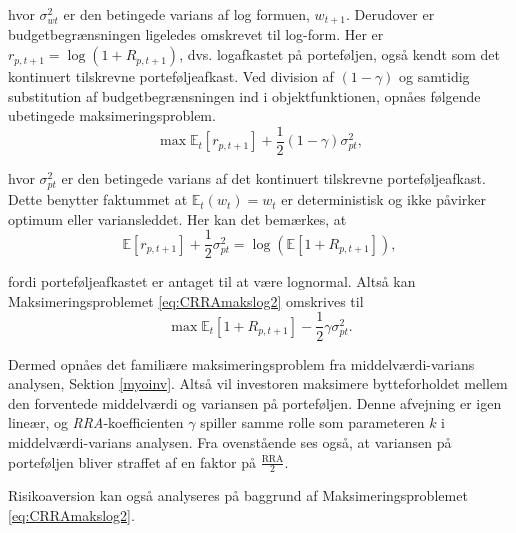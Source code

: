 \documentclass[
  a4paper,
  oneside]{memoir}
\begin{document}
hvor \(\sigma_{wt}^2\) er den betingede varians af log formuen, \(w_{t+1}\). Derudover er budgetbegrænsningen ligeledes omskrevet til log-form. Her er \(r_{p,t+1}=\log(1+R_{p,t+1})\), dvs. logafkastet på porteføljen, også kendt som det kontinuert tilskrevne porteføljeafkast. Ved division af \((1-\gamma)\) og samtidig substitution af budgetbegrænsningen ind i objektfunktionen, opnåes følgende ubetingede maksimeringsproblem.
\begin{equation}
\max\mathbb{E}_t\left[r_{p,t+1}\right] + \frac{1}{2}(1-\gamma)\sigma_{pt}^2, \label{eq:CRRAmakslog2}
\end{equation}

hvor \(\sigma_{pt}^2\) er den betingede varians af det kontinuert tilskrevne porteføljeafkast. Dette benytter faktummet at \(\mathbb{E}_t(w_t)=w_t\) er deterministisk og ikke påvirker optimum eller variansleddet. Her kan det bemærkes, at
\begin{equation}
\mathbb{E}\left[r_{p,t+1}\right]+\frac{1}{2}\sigma_{pt}^2=\log(\mathbb{E}\left[1+R_{p,t+1}\right]), \label{eq:portafkls}
\end{equation}

fordi porteføljeafkastet er antaget til at være lognormal. Altså kan Maksimeringsproblemet \eqref{eq:CRRAmakslog2} omskrives til
\begin{equation}
\max\mathbb{E}_t[1+R_{p,t+1}] - \frac{1}{2}\gamma\sigma_{pt}^2. \label{eq:CRRAmakslog3}
\end{equation}

Dermed opnåes det familiære maksimeringsproblem fra middelværdi-varians analysen, Sektion \ref{myoinv}. Altså vil investoren maksimere bytteforholdet mellem den forventede middelværdi og variansen på porteføljen. Denne afvejning er igen lineær, og \emph{RRA}-koefficienten \(\gamma\) spiller samme rolle som parameteren \(k\) i middelværdi-varians analysen. Fra ovenstående ses også, at variansen på porteføljen bliver straffet af en faktor på \(\tfrac{\text{RRA}}{2}\).

Risikoaversion kan også analyseres på baggrund af Maksimeringsproblemet \eqref{eq:CRRAmakslog2}.
\end{document}
